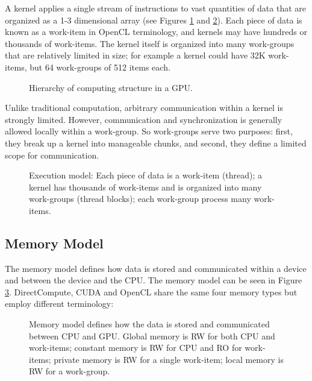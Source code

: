 \documentclass{comjnl}
\begin{document}
A kernel applies a single stream of instructions to vast quantities of data that are organized as a 1-3 dimensional array (see Figures \ref{figure:captura1paperCEC} and \ref{figure:grid}). Each piece of data is known as a work-item in OpenCL terminology, and kernels may have hundreds or thousands of work-items. The kernel itself is organized into many work-groups that are relatively limited in size; for example a kernel could have 32K work-items, but 64 work-groups of 512 items each. 

\begin{figure}[h]
\centerline{}
\caption{Hierarchy of computing structure in a GPU.}
\label{figure:captura1paperCEC}
\end{figure}

Unlike traditional computation, arbitrary communication within a kernel is strongly limited. However, communication and synchronization is generally allowed locally within a work-group. So work-groups serve two purposes: first, they break up a kernel into manageable chunks, and second, they define a limited scope for communication. 

\begin{figure}[h]
\centerline{}
\caption{Execution model: Each piece of data is a work-item (thread); a kernel has thousands of work-items and is organized into many work-groups (thread blocks); each work-group process many work-items.}
\label{figure:grid}
\end{figure}

\subsection{Memory Model}

The memory model defines how data is stored and communicated within a device and between the device and the CPU. The memory model can be seen in Figure \ref{figure:memory}. DirectCompute, CUDA and OpenCL share the same four memory types but employ different terminology:

\begin{figure}
\centerline{}
\caption{Memory model defines how the data is stored and communicated between CPU and GPU. Global memory is RW for both CPU and work-items; constant memory is RW for CPU and RO for work-items; private memory is RW for a single work-item; local memory is RW for a work-group.}
\label{figure:memory}
\end{figure}
\end{document}
